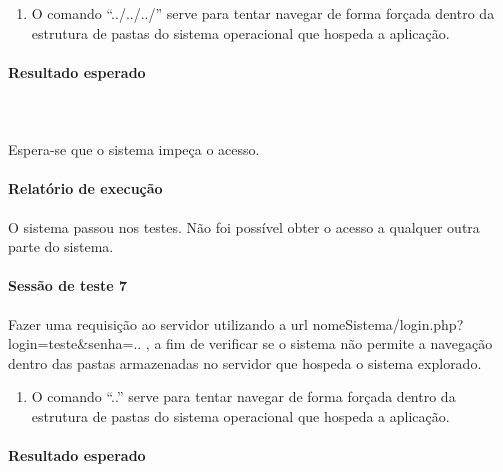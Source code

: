 \documentclass[
    12pt,               %
    openright,          %
    oneside,            %
    a4paper,            %
    section=TITLE,     %
    english,            %
    french,             %
    spanish,            %
    brazil              %
    ]{abntex2}
\begin{document}
\begin{enumerate}[start=1]
	
\item 
	O comando \textquotedblleft{}../../../\textquotedblright{} serve para tentar navegar de forma forçada dentro da estrutura de pastas do sistema operacional que hospeda a aplicação.

	

\end{enumerate}


\paragraph*{Resultado esperado}


\paragraph*{~}

Espera-se que o sistema impeça o acesso.



\paragraph*{Relatório de execução}

O sistema passou nos testes. Não foi possível obter o acesso a qualquer outra parte do sistema.



\paragraph*{Sessão de teste 7}

Fazer uma requisição ao servidor utilizando a url nomeSistema/login.php?login=teste\&senha=.. , a fim de verificar se o sistema não permite a navegação dentro das pastas armazenadas no servidor que hospeda o sistema explorado.



\begin{enumerate}[start=1]
	
\item 
	O comando \textquotedblleft{}..\textquotedblright{} serve para tentar navegar de forma forçada dentro da estrutura de pastas do sistema operacional que hospeda a aplicação.

	

\end{enumerate}


\paragraph*{Resultado esperado}
\end{document}
